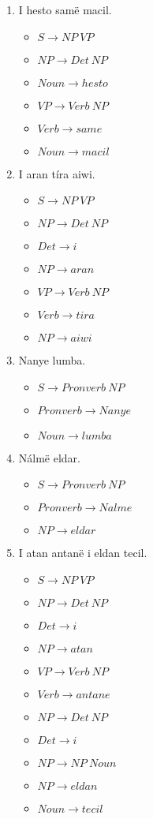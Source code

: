 \begin{enumerate}
  \item I hesto samë macil. 
    \begin{itemize}
      \item $S \to NP\ VP$ 
      \item $NP \to Det\ NP$
      \item $Noun \to hesto$ 
      \item $VP \to Verb\ NP$ 
      \item $Verb \to same$
      \item $Noun \to macil$
    \end{itemize}
  \item I aran tíra aiwi. 
    \begin{itemize}
      \item $S \to NP\ VP$ 
      \item $NP \to Det\ NP$ 
      \item $Det \to i$ 
      \item $NP \to aran$ 
      \item $VP \to Verb\ NP$
      \item $Verb \to tira$ 
      \item $NP \to aiwi$
    \end{itemize}
  \item Nanye lumba.
    \begin{itemize}
      \item $S \to Pronverb\ NP$
      \item $Pronverb \to Nanye$ 
      \item $Noun \to lumba$
    \end{itemize}
  \item Nálmë eldar. 
    \begin{itemize}
      \item $S \to Pronverb\ NP$ 
      \item $Pronverb \to Nalme$
      \item $NP \to eldar$
    \end{itemize}
  \item I atan antanë i eldan tecil.
    \begin{itemize}
      \item $S \to NP\ VP$
      \item $NP \to Det\ NP$
      \item $Det \to i$
      \item $NP \to atan$
      \item $VP \to Verb\ NP$
      \item $Verb \to antane$
      \item $NP \to Det\ NP$
      \item $Det \to i$
      \item $NP \to NP\ Noun$
      \item $NP \to eldan$
      \item $Noun \to tecil$
    \end{itemize}
\end{enumerate}

